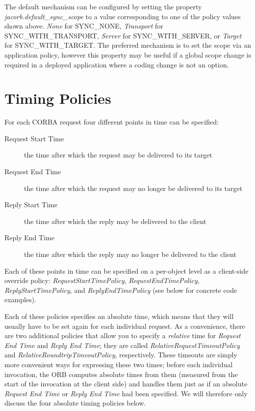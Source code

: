 The default mechanism can be configured by setting the property
\emph{jacorb.default\_sync\_scope} to a value corresponding to one of the
policy values shown above. \emph{None} for SYNC\_NONE, \emph{Transport}
for SYNC\_WITH\_TRANSPORT, \emph{Server} for SYNC\_WITH\_SERVER, or \emph{Target}
for SYNC\_WITH\_TARGET. The preferred mechanism is to set the scope via an
application policy, however this property may be useful if a global scope change
is required in a deployed application where a coding change is not an option.

\section{Timing Policies}

For each CORBA request four different points in time can be specified:

\begin{description}
\item[Request Start Time] the time after which the request may be
  delivered to its target
\item[Request End Time] the time after which the request may no longer
  be delivered to its target
\item[Reply Start Time] the time after which the reply may be delivered
  to the client
\item[Reply End Time] the time after which the reply may no longer be
  delivered to the client
\end{description}

Each of these points in time can be specified on a per-object level as
a client-side override policy: \mbox{\emph{RequestStartTimePolicy}},
\emph{RequestEndTimePolicy}, \emph{ReplyStartTimePolicy}, and
\emph{ReplyEndTimePolicy} (see below for concrete code examples).

Each of these policies specifies an absolute time, which means that
they will usually have to be set again for each individual
request.  As a convenience, there are two additional policies that
allow you to specify a \emph{relative} time for \emph{Request End
Time} and \emph{Reply End Time}; they are called
\emph{RelativeRequestTimeoutPolicy} and
\emph{RelativeRoundtripTimeoutPolicy}, respectively.  These timeouts
are simply more convenient ways for expressing these two times;
before each individual invocation, the ORB computes absolute times
from them (measured from the start of the invocation at the client
side) and handles them just as if an absolute \emph{Request End Time}
or \emph{Reply End Time} had been specified.  We will therefore only
discuss the four absolute timing policies below.

